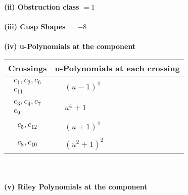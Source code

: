 \documentclass[1p]{elsarticle_modified}
\theoremstyle{definition}
\begin{document}
\flushleft \textbf{(ii) Obstruction class $= 1$}\\~\\
\flushleft \textbf{(iii) Cusp Shapes $= -8$}\\~\\
\newpage\renewcommand{\arraystretch}{1}
\flushleft \textbf{(iv) u-Polynomials at the component}\newline \\
\begin{tabular}{m{50pt}|m{274pt}}
Crossings & \hspace{64pt}u-Polynomials at each crossing \\
\hline $$\begin{aligned}c_{1},c_{2},c_{6}\\c_{11}\end{aligned}$$&$\begin{aligned}
&(u-1)^4
\end{aligned}$\\
\hline $$\begin{aligned}c_{3},c_{4},c_{7}\\c_{9}\end{aligned}$$&$\begin{aligned}
&u^4+1
\end{aligned}$\\
\hline $$\begin{aligned}c_{5},c_{12}\end{aligned}$$&$\begin{aligned}
&(u+1)^4
\end{aligned}$\\
\hline $$\begin{aligned}c_{8},c_{10}\end{aligned}$$&$\begin{aligned}
&(u^2+1)^2
\end{aligned}$\\
\hline
\end{tabular}\\~\\
\newpage\renewcommand{\arraystretch}{1}
\flushleft \textbf{(v) Riley Polynomials at the component}\newline \\
\end{document}
